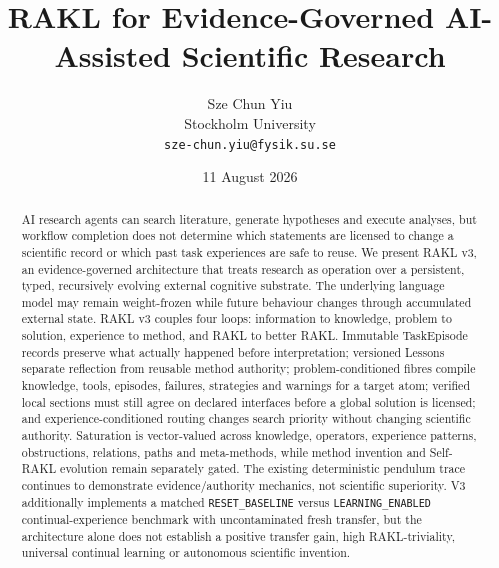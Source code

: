 \documentclass[11pt]{article}
\title{RAKL for Evidence-Governed AI-Assisted Scientific Research}
\author{Sze Chun Yiu\\Stockholm University\\\texttt{sze-chun.yiu@fysik.su.se}}
\date{11 August 2026}
\begin{document}
\maketitle

\begin{abstract}
AI research agents can search literature, generate hypotheses and execute analyses, but workflow completion does not determine which statements are licensed to change a scientific record or which past task experiences are safe to reuse. We present RAKL v3, an evidence-governed architecture that treats research as operation over a persistent, typed, recursively evolving external cognitive substrate. The underlying language model may remain weight-frozen while future behaviour changes through accumulated external state. RAKL v3 couples four loops: information to knowledge, problem to solution, experience to method, and RAKL to better RAKL. Immutable TaskEpisode records preserve what actually happened before interpretation; versioned Lessons separate reflection from reusable method authority; problem-conditioned fibres compile knowledge, tools, episodes, failures, strategies and warnings for a target atom; verified local sections must still agree on declared interfaces before a global solution is licensed; and experience-conditioned routing changes search priority without changing scientific authority. Saturation is vector-valued across knowledge, operators, experience patterns, obstructions, relations, paths and meta-methods, while method invention and Self-RAKL evolution remain separately gated. The existing deterministic pendulum trace continues to demonstrate evidence/authority mechanics, not scientific superiority. V3 additionally implements a matched \texttt{RESET\_BASELINE} versus \texttt{LEARNING\_ENABLED} continual-experience benchmark with uncontaminated fresh transfer, but the architecture alone does not establish a positive transfer gain, high RAKL-triviality, universal continual learning or autonomous scientific invention.
\end{abstract}























\end{document}
